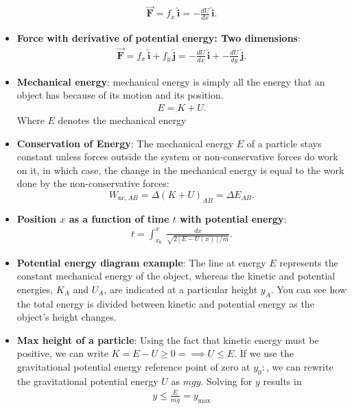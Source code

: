 \documentclass{report}
\begin{document}
\begin{itemize}
\begin{align*}
            \vec{\mathbf{F}} = f_{x}\,\hat{\mathbf{i}} = -\frac{dU}{dx}\,\hat{\mathbf{i}}
        .\end{align*}
    \item \textbf{Force with derivative of potential energy: Two dimensions}:
        \begin{align*}
            \vec{\mathbf{F}} = f_{x}\,\hat{\mathbf{i}} + f_{y}\,\hat{\mathbf{j}} = -\frac{dU}{dx}\,\hat{\mathbf{i}} + -\frac{dU}{dy}\,\hat{\mathbf{j}}
        .\end{align*}
    \item \textbf{Mechanical energy}:
        mechanical energy is simply all the energy that an object has because of its motion and its position.
        \begin{align*}
           E = K + U 
        .\end{align*}
        Where $E$ denotes the mechanical energy
    \item \textbf{Conservation of Energy}:
        The mechanical energy $E$ of a particle stays constant unless forces outside the system or non-conservative forces do work on it, in which case, the change in the mechanical energy is equal to the work done by the non-conservative forces:
        \[ W_{\text{nc},AB} = \Delta(K + U)_{AB} = \Delta E_{AB}. \]
    \item \textbf{Position $x$ as a function of time $t$ with potential energy}:
        \begin{align*}
            t = \int_{x_{0}}^{x}\ \frac{dx}{\sqrt{2[E-U(x)]/m}}
        .\end{align*}
    \item \textbf{Potential energy diagram example}:
        \bigbreak \noindent 
        \bigbreak \noindent 
        The line at energy \(E\) represents the constant mechanical energy of the object, whereas the kinetic and potential energies, \(K_A\) and \(U_A\), are indicated at a particular height \(y_A\). You can see how the total energy is divided between kinetic and potential energy as the object's height changes.
    \item \textbf{Max height of a particle}: Using the fact that kinetic energy must be positive, we can write $K = E-U \geq 0 =\implies U \leq E$. If we use the gravitational potential energy reference point of zero at $y_{0}:$, we can rewrite the gravitational potential energy $U$ as $mgy$. Solving for $y$ results in
        \begin{align*}
            y \leq \frac{E}{mg} = y_{\text{max}}

\end{align*}
\end{itemize}
\end{document}
